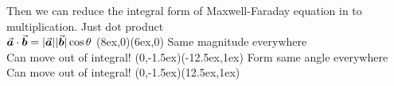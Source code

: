 \documentclass[class=article, crop=false, 12pt]{standalone}
\begin{document}
Then we can reduce the integral form of Maxwell-Faraday equation in to multiplication.
{\scriptsize Just dot product\\[-1ex]\scriptsize $\va*{a}\cdot\va*{b}=|\va*{a}||\va*{b}|\cos\theta$}
{(8ex,0)}{(6ex,0)}
{Same magnitude everywhere\\[-0.5ex]Can move out of integral!}
{(0,-1.5ex)}{(-12.5ex,1ex)}
{Form same angle everywhere\\[-0.5ex]Can move out of integral!}
{(0,-1.5ex)}{(12.5ex,1ex)}
\end{document}
